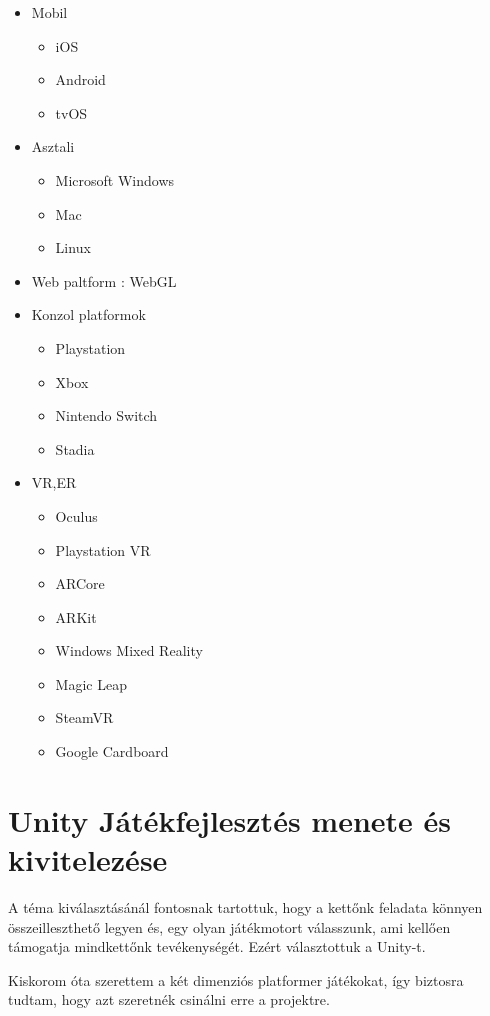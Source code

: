 \documentclass[]{thesis-ekf}
\theoremstyle{definition}
\begin{document}
	\begin{itemize}
		\item Mobil
		\begin{itemize}
			\item iOS
			\item Android
			\item tvOS
		\end{itemize}
		\item Asztali
		\begin{itemize}
			\item Microsoft Windows
			\item Mac
			\item Linux
		\end{itemize}
		\item Web paltform : WebGL
		\item Konzol platformok
		\begin{itemize}
			\item Playstation
			\item Xbox
			\item Nintendo Switch
			\item Stadia
		\end{itemize}
		\pagebreak
		\item VR,ER
		\begin{itemize}
			\item Oculus
			\item Playstation VR
			\item ARCore
			\item ARKit
			\item Windows Mixed Reality
			\item Magic Leap
			\item SteamVR
			\item Google Cardboard
		\end{itemize}
	\end{itemize}
	
	\chapter{Unity Játékfejlesztés menete és kivitelezése}
	A téma kiválasztásánál fontosnak tartottuk, hogy a kettőnk feladata könnyen összeilleszthető legyen és, egy olyan játékmotort válasszunk, ami kellően támogatja mindkettőnk tevékenységét. Ezért választottuk a Unity-t.
	
	Kiskorom óta szerettem a két dimenziós platformer játékokat, így biztosra tudtam, hogy azt szeretnék csinálni erre a projektre.
	
\end{document}

